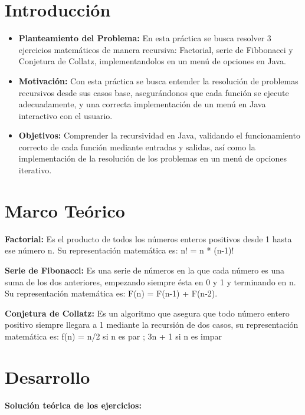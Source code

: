 \documentclass[letterpaper,12pt]{article}
\begin{document}
\tableofcontents
\clearpage

\section{Introducción}

\begin{itemize}
\item \textbf{Planteamiento del Problema:} En esta práctica se busca resolver 3 ejercicios matemáticos de manera recursiva: Factorial, serie de Fibbonacci y Conjetura de Collatz, implementandolos en un menú de opciones en Java.

\item \textbf{Motivación:} Con esta práctica se busca entender la resolución de problemas recursivos desde sus casos base, asegurándonos que cada función se ejecute adecuadamente, y una correcta implementación de un menú en Java interactivo con el usuario.

\item \textbf{Objetivos:} Comprender la recursividad en Java, validando el funcionamiento correcto de cada función mediante entradas y salidas, así como la implementación de la resolución de los problemas en un menú de opciones iterativo.

\end{itemize}
\section{Marco Teórico}
\textbf{Factorial:} Es el producto de todos los números enteros positivos desde 1 hasta ese número n. Su representación matemática es: n! = n * (n-1)! ~\cite{factorial}


\textbf{Serie de Fibonacci:} Es una serie de números en la que cada número es una suma de los dos anteriores, empezando siempre ésta en 0 y 1 y terminando en n. Su representación matemática es: F(n) = F(n-1) + F(n-2).~\cite{fibonacci}


\textbf{Conjetura de Collatz:} Es un algoritmo que asegura que todo número entero positivo siempre llegara a 1 mediante la recursión de dos casos, su representación matemática es: f(n) = n/2 si n es par ; 3n + 1 si n es impar~\cite{collatz}

\section{Desarrollo}

\textbf{Solución teórica de los ejercicios:}
\end{document}
